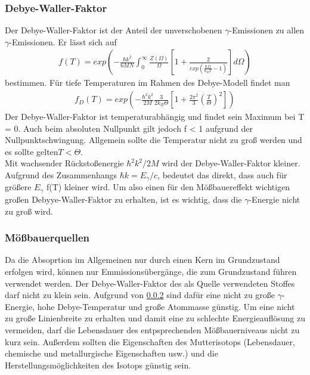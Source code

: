 \documentclass[a4paper,twoside,final]{article}
\begin{document}
\subsubsection{Debye-Waller-Faktor}
Der Debye-Waller-Faktor ist der Anteil der unverschobenen $\gamma$-Emissionen zu allen $\gamma$-Emissionen. Er lässt sich auf
\begin{align}
f(T) = exp\left(-\frac{\hbar k^2}{6MN}\int_{0}^{\infty} \frac{Z(\Omega)}{\Omega}\left[1+\frac{2}{exp(\frac{\hbar\Omega}{k_B T}-1)}\right] d\Omega\right)
\end{align}
bestimmen. Für tiefe Temperaturen im Rahmen des Debye-Modell findet man
\begin{align}
f_D(T) = exp\left(-\frac{\hbar^2k^2}{2M}\frac{3}{2k_B\Theta}\left[1+\frac{2\pi^2}{3}\left(\frac{T}{\Theta}\right)^2\right]\right)
\end{align}
Der Debye-Waller-Faktor ist temperaturabhängig und findet sein Maximum bei T = 0. Auch beim absoluten Nullpunkt gilt jedoch f < 1 aufgrund der Nullpunktschwingung. Allgemein sollte die Temperatur nicht zu groß werden und es sollte gelten$ T < \Theta$.\\
Mit wachsender Rückstoßenergie $\hbar^2k^2/2M$ wird der Debye-Waller-Faktor kleiner. Aufgrund des Zusammenhangs $\hbar k = E_\gamma / c $, bedeutet das direkt, dass auch für größere $E_\gamma$ f(T) kleiner wird. Um also einen für den Mößbauereffekt wichtigen großen Debyye-Waller-Faktor zu erhalten, ist es wichtig, dass die $\gamma$-Energie nicht zu groß wird.

\subsubsection{Mößbauerquellen}
Da die Absoprtion im Allgemeinen nur durch einen Kern im Grundzustand erfolgen wird, können nur Emmissionsübergänge, die zum Grundzustand führen verwendet werden. Der Debye-Waller-Faktor des als Quelle verwendeten Stoffes darf nicht zu klein sein. Aufgrund von \ref{} sind dafür eine nicht zu große $\gamma$-Energie, hohe Debye-Temperatur und große Atommasse günstig. Um eine nicht zu große Linienbreite zu erhalten und damit eine zu schlechte Energieauflösung zu vermeiden, darf die Lebensdauer des entpsprechenden Mößbauerniveaus nicht zu kurz sein. Außerdem sollten die Eigenschaften des Mutterisotops (Lebensdauer, chemische und metallurgische Eigenschaften usw.) und die Herstellungsmöglichkeiten des Isotops günstig sein.
\end{document}
